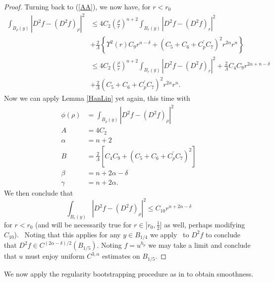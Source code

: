 \documentclass[12pt,leqno]{amsart}%
\theoremstyle{plain}
\numberwithin{equation}{section}
\theoremstyle{definition}
\begin{document}
\begin{proof}
Turning back to (\ref{AA}), we now have, for $r<r_{0}$%
\begin{align*}
\int_{B_{\rho}(y)}\left\vert D^{2}f-(D^{2}f)_{\rho}\right\vert ^{2}  &
\leq4C_{2}\left(  \frac{\rho}{r}\right)  ^{n+2}\int_{B_{r}(y)}\left\vert
D^{2}f-(D^{2}f)_{r}\right\vert ^{2}\\
&  +\frac{2}{\Lambda}\left\{  \Upsilon^{2}(r)C_{9}r^{n-\delta}+(C_{5}%
+C_{6}+C_{p}^{\prime}C_{7})^{2}r^{2\alpha}r^{n}\right\} \\
&  \leq4C_{2}\left(  \frac{\rho}{r}\right)  ^{n+2}\int_{B_{r}(y)}\left\vert
D^{2}f-(D^{2}f)_{r}\right\vert ^{2}+\frac{2}{\Lambda}C_{4}C_{9}r^{2\alpha
+n-\delta}\\
&  +\frac{2}{\Lambda}(C_{5}+C_{6}+C_{p}^{\prime}C_{7})^{2}r^{2\alpha}r^{n}.
\end{align*}
Now we can apply Lemma \ref{HanLin} yet again, this time with
\begin{align*}
\phi(\rho)  &  =\int_{B_{\rho}(y)}\left\vert D^{2}f-(D^{2}f)_{\rho}\right\vert
^{2}\\
A  &  =4C_{2}\\
\alpha &  =n+2\\
B  &  =\frac{2}{\Lambda}\left[  C_{4}C_{9}+(C_{5}+C_{6}+C_{p}^{\prime}C_{7})^{2}\right] \\
\beta &  =n+2\alpha-\delta\\
\gamma &  =n+2\alpha.
\end{align*}
We then conclude that
\[
\int_{B_{r}(y)}\left\vert D^{2}f-(D^{2}f)_{\rho}\right\vert ^{2}\leq C_{10}r^{n+2\alpha-\delta} \label{fg}
\]
for $r<r_{0}$ (and will be necessarily true for $r\in\lbrack r_{0},\frac{1}
{2}]$ as well, perhaps modifying $C_{10}$). \ Noting that this applies for any
$y\in B_{1/4}$ we apply \cite[Theorem 3.1]{HanLin} \ to $D^{2}f$ to conclude
that $D^{2}f\in C^{\left(  2\alpha-\delta\right)  /2}(B_{1/5}).$ Noting
$f=u^{h_{p}}$ we may take a limit and conclude that $u$ must enjoy uniform
$C^{3,\alpha}$ estimates on $B_{1/5}$.
\end{proof}

We now apply the regularity bootstrapping procedure as in \cite{BW1} to obtain smoothness.

\medskip
\end{document}
